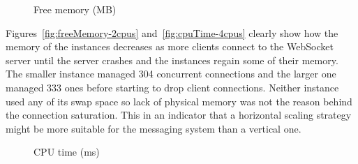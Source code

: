 \begin{figure}[h!]
	\centering
	 \hfill
	\caption{Free memory (MB)}
	\label{fig:freeMemory}
\end{figure}

\noindent
Figures~\ref{fig:freeMemory-2cpus} and~\ref{fig:cpuTime-4cpus} clearly show how the memory of the instances decreases as more clients connect to the WebSocket server until the server crashes and the instances regain some of their memory. The smaller instance managed 304 concurrent connections and the larger one managed 333 ones before starting to drop client connections. Neither instance used any of its swap space so lack of physical memory was not the reason behind the connection saturation. This in an indicator that a horizontal scaling strategy might be more suitable for the messaging system than a vertical one.
\\
\begin{figure}[h!]
	\centering
	 \hfill
	\caption{CPU time  (ms)}
\end{figure}

